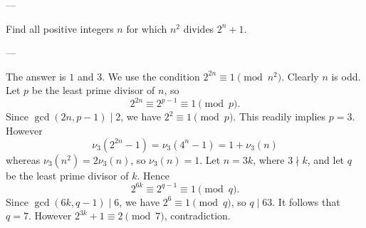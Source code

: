 
---

Find all positive integers $n$ for which $n^2$ divides $2^n+1$. 

---

The answer is $1$ and $3$. We use the condition $2^{2n}\equiv1\pmod{n^2}$. Clearly $n$ is odd. Let $p$ be the least prime divisor of $n$, so \[2^{2n}\equiv2^{p-1}\equiv1\pmod p.\]
Since $\gcd(2n,p-1)\mid2$, we have $2^2\equiv1\pmod p$. This readily implies $p=3$. However \[\nu_3\left(2^{2n}-1\right)=\nu_3\left(4^n-1\right)=1+\nu_3(n)\]
whereas $\nu_3(n^2)=2\nu_3(n)$, so $\nu_3(n)=1$. Let $n=3k$, where $3\nmid k$, and let $q$ be the least prime divisor of $k$. Hence \[2^{6k}\equiv2^{q-1}\equiv1\pmod q.\]
Since $\gcd(6k,q-1)\mid6$, we have $2^6\equiv1\pmod q$, so $q\mid63$. It follows that $q=7$. However $2^{3k}+1\equiv2\pmod7$, contradiction.

